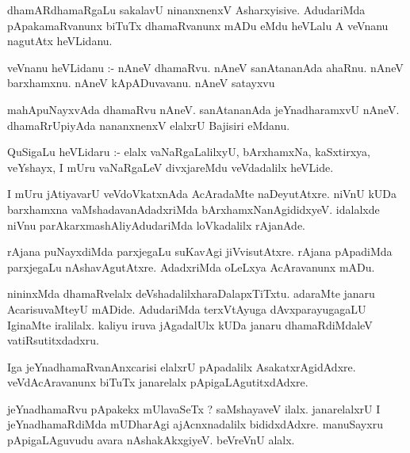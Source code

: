\documentclass{article}
\begin{document}
\begin{mn}
dhamARdhamaRgaLu sakalavU ninanxnenxV Asharxyisive.  AdudariMda pApakamaRvanunx biTuTx 
dhamaRvanunx mADu eMdu heVLalu A veVnanu nagutAtx heVLidanu.
\end{mn}

\begin{mn}
veVnanu heVLidanu :- nAneV dhamaRvu.  nAneV sanAtananAda ahaRnu. nAneV barxhamxnu.  
nAneV kApADuvavanu.  nAneV satayxvu                                                                                                                                                                                               
\end{mn}

\begin{mn}
mahApuNayxvAda dhamaRvu nAneV.  sanAtananAda jeYnadharamxvU  nAneV. 
dhamaRrUpiyAda nananxnenxV elalxrU Bajisiri eMdanu.
\end{mn}

\begin{mn}
QuSigaLu  heVLidaru :- elalx vaNaRgaLalilxyU, bArxhamxNa, kaSxtirxya, 
veYshayx, I mUru vaNaRgaLeV divxjareMdu  veVdadalilx heVLide.
\end{mn}

\begin{mn}
I mUru jAtiyavarU veVdoVkatxnAda  AcAradaMte naDeyutAtxre.  niVnU  kUDa barxhamxna vaMshadavanAdadxriMda  
bArxhamxNanAgididxyeV.  idalalxde niVnu parAkarxmashAliyAdudariMda loVkadalilx rAjanAde. 
\end{mn}

\begin{mn}
rAjana puNayxdiMda  parxjegaLu suKavAgi jiVvisutAtxre.  rAjana pApadiMda 
parxjegaLu nAshavAgutAtxre.  AdadxriMda oLeLxya AcAravanunx mADu.
\end{mn}

\begin{mn}
nininxMda dhamaRvelalx deVshadalilxharaDalapxTiTxtu.  adaraMte janaru AcarisuvaMteyU 
mADide.  AdudariMda terxVtAyuga dAvxparayugagaLU  IginaMte iralilalx.  kaliyu 
iruva jAgadalUlx kUDa janaru  dhamaRdiMdaleV vatiRsutitxdadxru.
\end{mn}

\begin{mn}
Iga jeYnadhamaRvanAnxcarisi elalxrU pApadalilx AsakatxrAgidAdxre.  
veVdAcAravanunx biTuTx janarelalx pApigaLAgutitxdAdxre.
\end{mn}

\begin{mn}
jeYnadhamaRvu pApakekx mUlavaSeTx ?  saMshayaveV ilalx.  janarelalxrU  I jeYnadhamaRdiMda  
mUDharAgi ajAcnxnadalilx bididxdAdxre.  manuSayxru pApigaLAguvudu avara nAshakAkxgiyeV.  beVreVnU alalx.
\end{mn}
\end{document}
